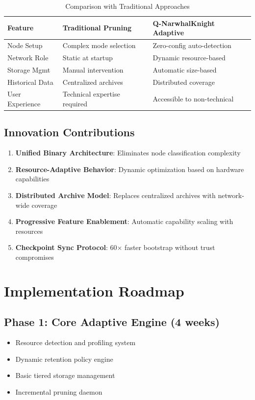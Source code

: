 \documentclass[11pt,a4paper]{article}
\begin{document}
\begin{table}[h]
\centering
\small
\begin{tabular}{lll}
\toprule
\textbf{Feature} & \textbf{Traditional Pruning} & \textbf{Q-NarwhalKnight Adaptive} \\
\midrule
Node Setup & Complex mode selection & Zero-config auto-detection \\
Network Role & Static at startup & Dynamic resource-based \\
Storage Mgmt & Manual intervention & Automatic size-based \\
Historical Data & Centralized archives & Distributed coverage \\
User Experience & Technical expertise required & Accessible to non-technical \\
\bottomrule
\end{tabular}
\caption{Comparison with Traditional Approaches}
\end{table}

\subsection{Innovation Contributions}

\begin{enumerate}
\item \textbf{Unified Binary Architecture}: Eliminates node classification complexity
\item \textbf{Resource-Adaptive Behavior}: Dynamic optimization based on hardware capabilities
\item \textbf{Distributed Archive Model}: Replaces centralized archives with network-wide coverage
\item \textbf{Progressive Feature Enablement}: Automatic capability scaling with resources
\item \textbf{Checkpoint Sync Protocol}: 60× faster bootstrap without trust compromises
\end{enumerate}

\section{Implementation Roadmap}

\subsection{Phase 1: Core Adaptive Engine (4 weeks)}
\begin{itemize}
\item Resource detection and profiling system
\item Dynamic retention policy engine
\item Basic tiered storage management
\item Incremental pruning daemon
\end{itemize}
\end{document}
